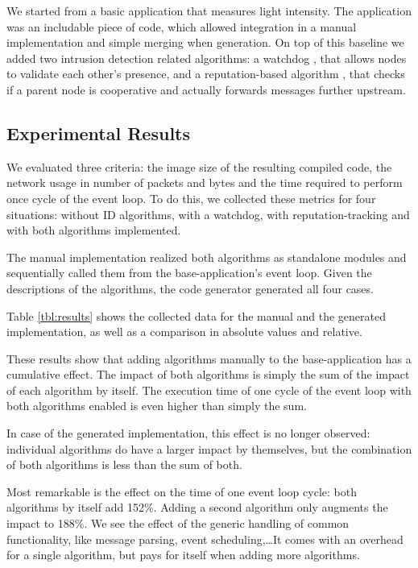 \documentclass[conference]{IEEEtran}
\begin{document}
We started from a basic application that measures light intensity. The
application was an includable piece of code, which allowed integration in a
manual implementation and simple merging when generation. On top of this
baseline we added two intrusion detection related algorithms: a
watchdog \cite{mishra2004intrusion}, that allows nodes to validate each other's
presence, and a reputation-based algorithm \cite{ganeriwal2008reputation}, that
checks if a parent node is cooperative and actually forwards messages further
upstream.

\subsection{Experimental Results}

We evaluated three criteria: the image size of the resulting compiled code, the
network usage in number of packets and bytes and the time required to perform
once cycle of the event loop. To do this, we collected these metrics for four
situations: without ID algorithms, with a watchdog, with reputation-tracking
and with both algorithms implemented.

The manual implementation realized both algorithms as standalone modules and
sequentially called them from the base-application's event loop. Given the
\NAME descriptions of the algorithms, the code generator generated all four
cases.

Table \ref{tbl:results} shows the collected data for the manual and the
generated implementation, as well as a comparison in absolute values and
relative.

These results show that adding algorithms manually to the base-application has
a cumulative effect. The impact of both algorithms is simply the sum of the
impact of each algorithm by itself. The execution time of one cycle of the
event loop with both algorithms enabled is even higher than simply the sum.

In case of the generated implementation, this effect is no longer observed:
individual algorithms do have a larger impact by themselves, but the
combination of both algorithms is less than the sum of both.

Most remarkable is the effect on the time of one event loop cycle: both
algorithms by itself add 152\%. Adding a second algorithm only augments the
impact to 188\%. We see the effect of the generic handling of common
functionality, like message parsing, event scheduling,\dots It comes with an
overhead for a single algorithm, but pays for itself when adding more
algorithms.
\end{document}
